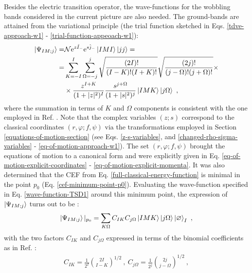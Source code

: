 Besides the electric transition operator, the wave-functions for the wobbling bands considered in the current picture are also needed. The ground-bands are attained from the variational principle (the trial function sketched in Eqs. \ref{tdve-approach-w1} - \ref{trial-function-appeoach-w1}):
\begin{align}
    \ket{\Psi_{IM;j}}=&\mathcal{N}\mathrm{e}^{z\hat{I}_-}\mathrm{e}^{s\hat{j}_-}\ket{IMI}\ket{jj}=\nonumber\\
    =&\sum_{K=-I}^I\sum_{\Omega=-j}^j\sqrt{\frac{(2I)!}{(I-K)!(I+K)!}}\sqrt{\frac{(2j)!}{(j-\Omega)!(j+\Omega)!}}\times\nonumber\\
    &\times\frac{z^{I+K}}{(1+|z|^2)^I}\frac{s^{j+\Omega}}{(1+|s|^2)^j}\ket{IMK}\ket{j\Omega}\ ,
    \label{wave-function-TSD1}
\end{align}
where the summation in terms of $K$ and $\Omega$ components is consistent with the one employed in Ref. \cite{budaca2018semiclassical}. Note that the complex variables $(z;s)$ correspond to the classical coordinates $(r,\varphi;f,\psi)$ via the transformations employed in Section \ref{equations-of-motion-section} (see Eqs. \ref{z-s-variables}, and \ref{changed-rho-sigma-variables} - \ref{eq-of-motion-approach-w1}). The set $(r,\varphi;f,\psi)$ brought the equations of motion to a canonical form and were explicitly given in Eq. \ref{eq-of-motion-explicit-coordinates} - \ref{eq-of-motion-explicit-momenta}. It was also determined that the CEF from Eq. \ref{full-classical-energy-function} is minimal in the point $p_0$ (Eq. \ref{cef-minimum-point-p0}). Evaluating the wave-function specified in Eq. \ref{wave-function-TSD1} around this minimum point, the expression of $\ket{\Psi_{IM;j}}$ turns out to be \cite{raduta2020approach,raduta2020towards}:
\begin{align}
    \ket{\Psi_{IM;j}}|_{p_0}=\sum_{K\Omega}C_{IK}C_{j\Omega}\ket{IMK}\ket{j\Omega}\ket{\varnothing}_I\ ,
    \label{wave-function-TSD1-p0}
\end{align}
with the two factors $C_{IK}$ and $C_{j\Omega}$ expressed in terms of the binomial coefficients as in Ref. \cite{raduta2017semiclassical}:
\begin{align}
    C_{IK}=\frac{1}{2^I}\binom{2I}{I-K}^{1/2}\ ,\ C_{j\Omega}=\frac{1}{2^j}\binom{2j}{j-\Omega}^{1/2}\ ,
    \label{CIK-binomial-coefficient}
\end{align}
